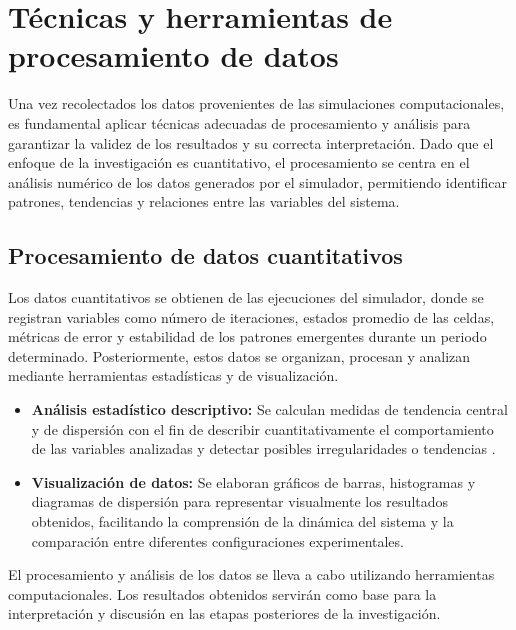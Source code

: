 \section{Técnicas y herramientas de procesamiento de datos}

Una vez recolectados los datos provenientes de las simulaciones computacionales, es fundamental aplicar técnicas adecuadas de procesamiento y análisis para garantizar la validez de los resultados y su correcta interpretación. Dado que el enfoque de la investigación es cuantitativo, el procesamiento se centra en el análisis numérico de los datos generados por el simulador, permitiendo identificar patrones, tendencias y relaciones entre las variables del sistema.

\subsection{Procesamiento de datos cuantitativos}

Los datos cuantitativos se obtienen de las ejecuciones del simulador, donde se registran variables como número de iteraciones, estados promedio de las celdas, métricas de error y estabilidad de los patrones emergentes durante un periodo determinado. Posteriormente, estos datos se organizan, procesan y analizan mediante herramientas estadísticas y de visualización.

\begin{itemize}
	\item \textbf{Análisis estadístico descriptivo:} Se calculan medidas de tendencia central y de dispersión con el fin de describir cuantitativamente el comportamiento de las variables analizadas y detectar posibles irregularidades o tendencias \cite{estadistico}.
	
	\item \textbf{Visualización de datos:} Se elaboran gráficos de barras, histogramas y diagramas de dispersión para representar visualmente los resultados obtenidos, facilitando la comprensión de la dinámica del sistema y la comparación entre diferentes configuraciones experimentales.
\end{itemize}

El procesamiento y análisis de los datos se lleva a cabo utilizando herramientas computacionales. Los resultados obtenidos servirán como base para la interpretación y discusión en las etapas posteriores de la investigación.
